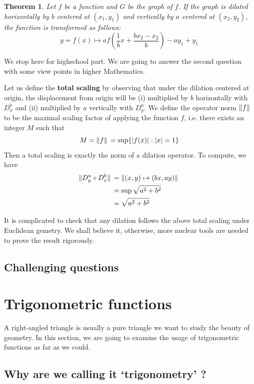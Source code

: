 \documentclass[12pt]{article}
\newtheorem*{theorem}{Theorem}
\begin{document}
    \begin{theorem}
        Let $f$ be a function and $G$ be the graph of $f$. If the graph is dilated horizontally by $b$ centered at $(x_1,y_1)$ and vertically by $a$ centered at $(x_2,y_2)$, the function is transformed as follows: \[y=f(x)\mapsto af(\frac{1}{b}x+\frac{bx_2-x_2}{b})-ay_1+y_1\]
    \end{theorem}

    We stop here for highschool part. We are going to answer the second question with some view points in higher Mathematics.

    Let us define the \textbf{total scaling} by observing that under the dilation centered at origin, the displacement from origin will be (i) multiplied by $b$ horizontally with $D_x^b$ and (ii) multiplied by $a$ vertically with $D_y^a$. We define the operator norm $\norm*{f}$ to be the maximal scaling factor of applying the function $f$, i.e. there exists an integer $M$ such that \[M=\norm*{f}=\sup\{|f(x)|:|x|=1\}\] Then a total scaling is exactly the norm of a dilation operator. To compute, we have\begin{align*}
        \norm*{D_y^a\circ D_x^b}&=\norm*{(x,y)\mapsto(bx,ay)}\\
        &=\sup{\sqrt{a^2+b^2}}\\
        &=\sqrt{a^2+b^2}
    \end{align*}

    It is complicated to check that any dilation follows the above total scaling under Euclidean gemetry. We shall believe it, otherwise, more nuclear tools are needed to prove the result rigorously.

    \subsection{Challenging questions}

    \newpage

    \section{Trigonometric functions}

    A right-angled triangle is usually a pure triangle we want to study the beauty of geometry. In this section, we are going to examine the usage of trigonometric functions as far as we could.

    \subsection{Why are we calling it `trigonometry' ?}
\end{document}

